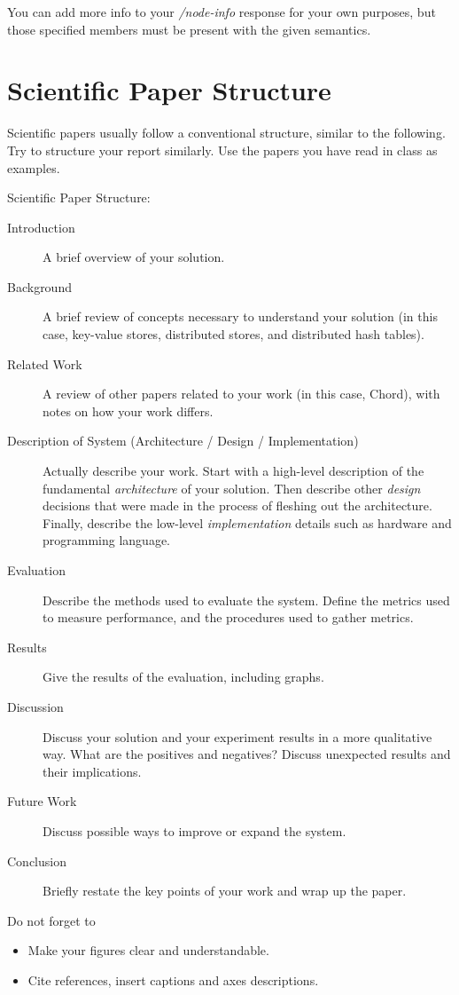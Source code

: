 \documentclass[]{article}
\begin{document}
You can add more info to your \textit{/node-info} response for your own purposes,
but those specified members must be present with the given semantics.

\section{Scientific Paper Structure}
\label{scientific_paper_structure}

Scientific papers usually follow a conventional structure, similar to the following.
Try to structure your report similarly.
Use the papers you have read in class as examples.

Scientific Paper Structure:

\begin{description}
    \item[Introduction]
        A brief overview of your solution.

    \item[Background]
        A brief review of concepts necessary to understand your solution (in this case, key-value stores, distributed stores, and distributed hash tables).

    \item[Related Work] A review of other papers related to your work
        (in this case, Chord),
        with notes on how your work differs.

    \item[Description of System (Architecture / Design / Implementation)]
        Actually describe your work.
        Start with a high-level description of the fundamental \textit{architecture} of your solution.
        Then describe other \textit{design} decisions that were made in the process of fleshing out the architecture.
        Finally, describe the low-level \textit{implementation} details
        such as hardware and programming language.

    \item[Evaluation]
        Describe the methods used to evaluate the system.
        Define the metrics used to measure performance,
        and the procedures used to gather metrics.

    \item[Results]
        Give the results of the evaluation, including graphs.

    \item[Discussion]
        Discuss your solution and your experiment results in a more qualitative way. What are the positives and negatives?
        Discuss unexpected results and their implications.

    \item[Future Work]
        Discuss possible ways to improve or expand the system.

    \item[Conclusion]
        Briefly restate the key points of your work and wrap up the paper.

\end{description}

Do not forget to
\begin{itemize}
    \item Make your figures clear and understandable. 
    \item Cite references, insert captions and axes descriptions.
\end{itemize}
\end{document}
